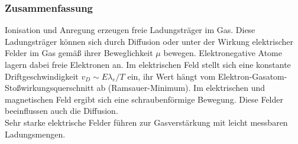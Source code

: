 \subsubsection*{Zusammenfassung}

Ionisation und Anregung erzeugen freie Ladungsträger im Gas. Diese Ladungsträger können sich durch
Diffusion oder unter der Wirkung elektrischer Felder im Gas gemäß ihrer Beweglichkeit $\mu$
bewegen. Elektronegative Atome lagern dabei freie Elektronen an. Im elektrischen Feld stellt sich
eine konstante Driftgeschwindigkeit $v_D\sim E\lambda_e/T$ ein, ihr Wert hängt vom
Elektron-Gasatom-Stoßwirkungsquerschnitt ab (Ramsauer-Minimum). Im elektrischen und magnetischen
Feld ergibt sich eine schraubenförmige Bewegung. Diese Felder beeinflussen auch die Diffusion.
\\
Sehr starke elektrische Felder führen zur Gasverstärkung mit leicht messbaren Ladungsmengen.
